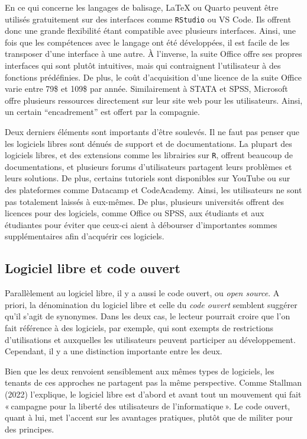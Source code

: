 \documentclass[
  letterpaper,
  DIV=11,
  numbers=noendperiod]{scrreprt}
\begin{document}
En ce qui concerne les langages de balisage, LaTeX ou Quarto peuvent
être utilisés gratuitement sur des interfaces comme \texttt{RStudio} ou
VS Code. Ils offrent donc une grande flexibilité étant compatible avec
plusieurs interfaces. Ainsi, une fois que les compétences avec le
langage ont été développées, il est facile de les transposer d'une
interface à une autre. À l'inverse, la suite Office offre ses propres
interfaces qui sont plutôt intuitives, mais qui contraignent
l'utilisateur à des fonctions prédéfinies. De plus, le coût
d'acquisition d'une licence de la suite Office varie entre 79\$ et 109\$
par année. Similairement à STATA et SPSS, Microsoft offre plusieurs
ressources directement sur leur site web pour les utilisateurs. Ainsi,
un certain ``encadrement'' est offert par la compagnie.

Deux derniers éléments sont importants d'être soulevés. Il ne faut pas
penser que les logiciels libres sont dénués de support et de
documentations. La plupart des logiciels libres, et des extensions comme
les librairies sur \texttt{R}, offrent beaucoup de documentations, et
plusieurs forums d'utilisateurs partagent leurs problèmes et leurs
solutions. De plus, certains tutoriels sont disponibles sur YouTube ou
sur des plateformes comme Datacamp et CodeAcademy. Ainsi, les
utilisateurs ne sont pas totalement laissés à eux-mêmes. De plus,
plusieurs universités offrent des licences pour des logiciels, comme
Office ou SPSS, aux étudiants et aux étudiantes pour éviter que ceux-ci
aient à débourser d'importantes sommes supplémentaires afin d'acquérir
ces logiciels.

\subsection{Logiciel libre et code
ouvert}\label{logiciel-libre-et-code-ouvert}

Parallèlement au logiciel libre, il y a aussi le code ouvert, ou
\emph{open source}. A priori, la dénomination du logiciel libre et celle
du \emph{code ouvert} semblent suggérer qu'il s'agit de synonymes. Dans
les deux cas, le lecteur pourrait croire que l'on fait référence à des
logiciels, par exemple, qui sont exempts de restrictions d'utilisations
et auxquelles les utilisateurs peuvent participer au développement.
Cependant, il y a une distinction importante entre les deux.

Bien que les deux renvoient sensiblement aux mêmes types de logiciels,
les tenants de ces approches ne partagent pas la même perspective. Comme
Stallman (2022) l'explique, le logiciel libre est d'abord et avant tout
un mouvement qui fait « campagne pour la liberté des utilisateurs de
l'informatique ». Le code ouvert, quant à lui, met l'accent sur les
avantages pratiques, plutôt que de militer pour des principes.
\end{document}
